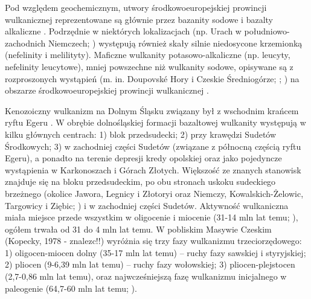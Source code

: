 \documentclass[11.5pt,twoside]{report}
\begin{document}
 Pod względem geochemicznym, utwory środkowoeuropejskiej prowincji wulkanicznej reprezentowane są głównie przez bazanity sodowe i bazalty alkaliczne \parencite{Wilson.2006}. Podrzędnie w niektórych lokalizacjach (np. Urach w południowo-zachodnich Niemczech; \cite{Krochert.2009}) występują również skały silnie niedosycone krzemionką (nefelinity i melilityty). Maficzne wulkanity potasowo-alkaliczne (np. leucyty, nefelinity leucytowe), mniej powszechne niż wulkanity sodowe, opisywane są z rozproszonych wystąpień (m. in. Doupovsk\'{e} Hory i Czeskie Średniogórze; \cite{Skacelova.2009}; \cite{Ulrych.2002}) na obszarze środkowoeuropejskiej prowincji wulkanicznej \parencite{Wilson.2006}.
 
 Kenozoiczny wulkanizm na Dolnym Śląsku związany był z wschodnim krańcem ryftu Egeru \parencite{Krzeminska.2011}. W obrębie dolnośląskiej formacji bazaltowej wulkanity występują w kilku głównych centrach: 1) blok przedsudecki; 2) przy krawędzi Sudetów Środkowych; 3) w zachodniej części Sudetów (związane z północną częścią ryftu Egeru), a ponadto na terenie depresji kredy opolskiej oraz jako pojedyncze wystąpienia w Karkonoszach i Górach Złotych. Większość ze znanych stanowisk znajduje się na bloku przedsudeckim, po obu stronach uskoku sudeckiego brzeżnego (okolice Jawora, Legnicy i Złotoryi oraz Niemczy, Kowalskich-Żelowic, Targowicy i Ziębic; \cite{Badura.2005}) i w zachodniej części Sudetów. Aktywność wulkaniczna miała miejsce przede wszystkim w oligocenie i miocenie (31-14 mln lat temu; \cite{Badura.2004}), ogółem trwała od 31 do 4 mln lat temu. W pobliskim Masywie Czeskim (Kopecky, 1978 - znalezc!!) wyróżnia się trzy fazy wulkanizmu trzeciorzędowego: 1) oligocen-miocen dolny (35-17 mln lat temu) -- ruchy fazy sawskiej i styryjskiej; 2) pliocen (9-6,39 mln lat temu) -- ruchy fazy wołowskiej; 3) pliocen-plejstocen (2,7-0,86 mln lat temu), oraz najwcześniejszą fazę wulkanizmu inicjalnego w paleogenie (64,7-60 mln lat temu; \cite{Szymkowiak.1985}).
 
 
\end{document}

